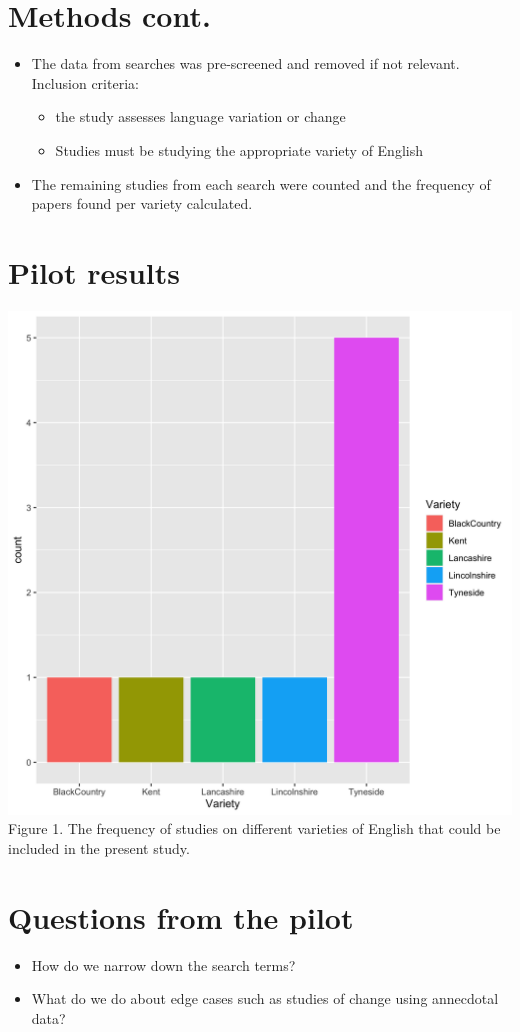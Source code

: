 \documentclass[a0paper,fleqn]{betterposter}
\begin{document}
{
	\section{Methods cont.}	
\begin{itemize}
	\item The data from searches was pre-screened and removed if not relevant. Inclusion criteria:
	\begin{itemize}
		\item the study assesses language variation or change
		\item Studies must be studying the appropriate variety of English
	\end{itemize}
	\item The remaining studies from each search were counted and the frequency of papers found per variety calculated.

\end{itemize}



\section{Pilot results}

\includegraphics[scale=0.28]{posterPlot.png}
Figure 1. The frequency of studies on different varieties of English that could be included in the present study.

\section{Questions from the pilot}
\begin{itemize}
	\item How do we narrow down the search terms?
	\item What do we do about edge cases such as studies of change using annecdotal data?
\end{itemize}



}
\end{document}
